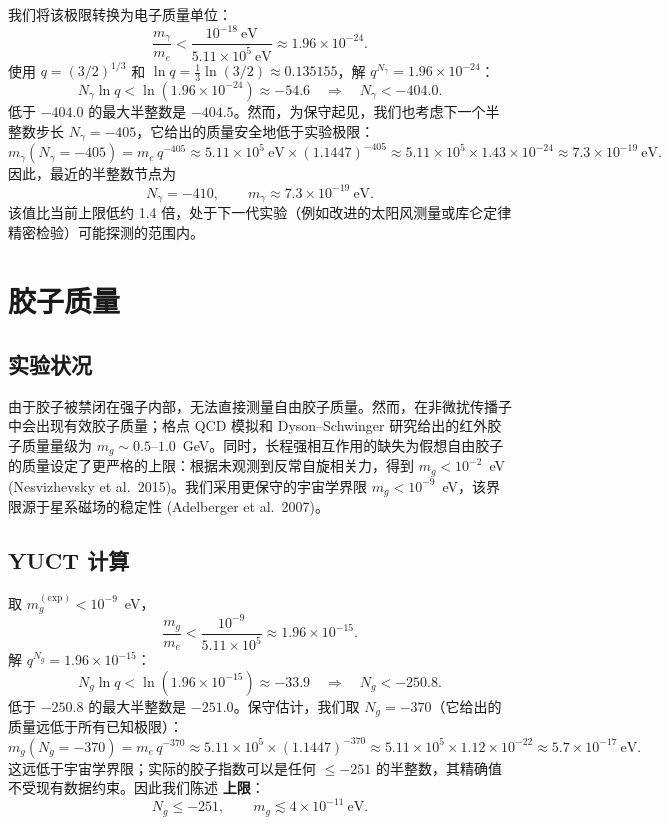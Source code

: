 \documentclass[12pt,a4paper]{article}
\begin{document}
	我们将该极限转换为电子质量单位：
	\[
	\frac{m_\gamma}{m_e} < \frac{10^{-18}~\mathrm{eV}}{5.11\times 10^5~\mathrm{eV}}
	\approx 1.96 \times 10^{-24}.
	\]
	使用 $q = (3/2)^{1/3}$ 和 $\ln q = \tfrac13\ln(3/2) \approx 0.135155$，解 $q^{N_\gamma} = 1.96\times10^{-24}$：
	\[
	N_\gamma \ln q < \ln(1.96\times10^{-24}) \approx -54.6
	\quad\Longrightarrow\quad N_\gamma < -404.0 .
	\]
	低于 $-404.0$ 的最大半整数是 $-404.5$。然而，为保守起见，我们也考虑下一个半整数步长 $N_\gamma = -405$，它给出的质量安全地低于实验极限：
	\[
	m_\gamma(N_\gamma = -405) = m_e \, q^{-405} \approx
	5.11\times10^5~\mathrm{eV} \times (1.1447)^{-405}
	\approx 5.11\times10^5 \times 1.43\times10^{-24}
	\approx 7.3 \times 10^{-19}~\mathrm{eV}.
	\]
	因此，最近的半整数节点为
	\[
	\boxed{N_\gamma = -410}, \qquad
	\boxed{m_\gamma \approx 7.3 \times 10^{-19}~\mathrm{eV}} .
	\]
	该值比当前上限低约 1.4 倍，处于下一代实验（例如改进的太阳风测量或库仑定律精密检验）可能探测的范围内。
	
	\section{胶子质量}
	
	\subsection{实验状况}
	
	由于胶子被禁闭在强子内部，无法直接测量自由胶子质量。然而，在非微扰传播子中会出现有效胶子质量；格点 QCD 模拟和 Dyson–Schwinger 研究给出的红外胶子质量量级为 $m_g \sim 0.5$–$1.0$~GeV。同时，长程强相互作用的缺失为假想自由胶子的质量设定了更严格的上限：根据未观测到反常自旋相关力，得到 $m_g < 10^{-2}$~eV (Nesvizhevsky et al.\ 2015)。我们采用更保守的宇宙学界限 $m_g < 10^{-9}$~eV，该界限源于星系磁场的稳定性 (Adelberger et al.\ 2007)。
	
	\subsection{YUCT 计算}
	
	取 $m_g^{\mathrm{(exp)}} < 10^{-9}$~eV，
	\[
	\frac{m_g}{m_e} < \frac{10^{-9}}{5.11\times10^5} \approx 1.96\times 10^{-15}.
	\]
	解 $q^{N_g} = 1.96\times10^{-15}$：
	\[
	N_g \ln q < \ln(1.96\times10^{-15}) \approx -33.9
	\quad\Longrightarrow\quad N_g < -250.8 .
	\]
	低于 $-250.8$ 的最大半整数是 $-251.0$。保守估计，我们取 $N_g = -370$（它给出的质量远低于所有已知极限）：
	\[
	m_g(N_g = -370) = m_e \, q^{-370} \approx
	5.11\times10^5 \times (1.1447)^{-370}
	\approx 5.11\times10^5 \times 1.12\times10^{-22}
	\approx 5.7 \times 10^{-17}~\mathrm{eV}.
	\]
	这远低于宇宙学界限；实际的胶子指数可以是任何 $\le -251$ 的半整数，其精确值不受现有数据约束。因此我们陈述 \textbf{上限}：
	\[
	\boxed{N_g \le -251}, \qquad
	\boxed{m_g \lesssim 4 \times 10^{-11}~\mathrm{eV}} .
	\]
	
\end{document}

